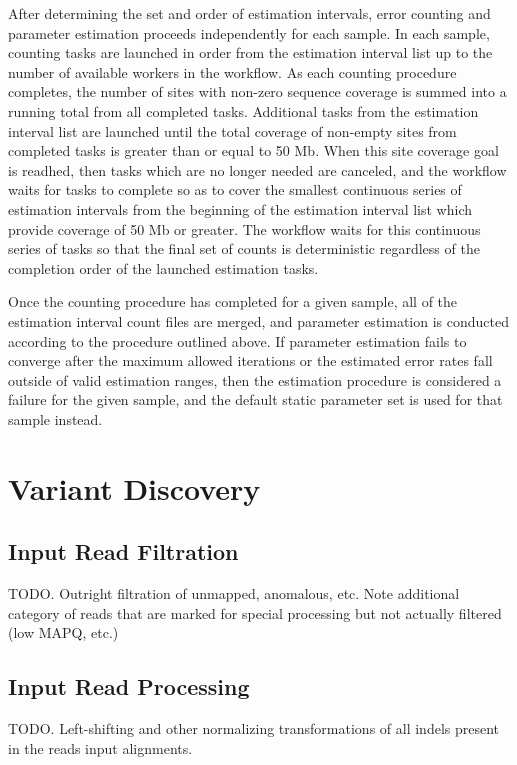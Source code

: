 \documentclass{article}
\begin{document}
After determining the set and order of estimation intervals, error counting and parameter estimation proceeds independently for each sample. In each sample, counting tasks are launched in order from the estimation interval list up to the number of available workers in the workflow. As each counting procedure completes, the number of sites with non-zero sequence coverage is summed into a running total from all completed tasks. Additional tasks from the estimation interval list are launched until the total coverage of non-empty sites from completed tasks is greater than or equal to 50 Mb. When this site coverage goal is readhed, then tasks which are no longer needed are canceled, and the workflow waits for tasks to complete so as to cover the smallest continuous series of estimation intervals from the beginning of the estimation interval list which provide coverage of 50 Mb or greater. The workflow waits for this continuous series of tasks so that the final set of counts is deterministic regardless of the completion order of the launched estimation tasks.

Once the counting procedure has completed for a given sample, all of the estimation interval count files are merged, and parameter estimation is conducted according to the procedure outlined above. If parameter estimation fails to converge after the maximum allowed iterations or the estimated error rates fall outside of valid estimation ranges, then the estimation procedure is considered a failure for the given sample, and the default static parameter set is used for that sample instead.


\section{Variant Discovery}


\subsection{Input Read Filtration}

TODO. Outright filtration of unmapped, anomalous, etc. Note additional category of reads that are marked for special processing but not actually filtered (low MAPQ, etc.)


\subsection{Input Read Processing}

TODO. Left-shifting and other normalizing transformations of all indels present in the reads input alignments.
\end{document}
